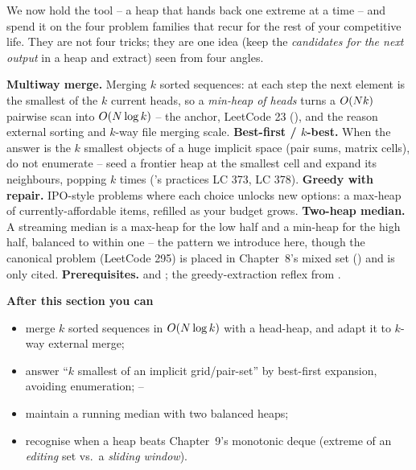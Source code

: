 \begin{topicintro}
We now hold the tool -- a heap that hands back one extreme at a time -- and spend it on the four problem
families that recur for the rest of your competitive life. They are not four tricks; they are one idea
(keep the \emph{candidates for the next output} in a heap and extract) seen from four angles.

\textbf{Multiway merge.} Merging $k$ sorted sequences: at each step the next element is the smallest of the
$k$ current heads, so a \emph{min-heap of heads} turns a $O(Nk)$ pairwise scan into $O(N\log k)$ --
the anchor, LeetCode 23 (), and the reason external sorting and $k$-way file merging
scale. \textbf{Best-first / $k$-best.} When the answer is the $k$ smallest objects of a huge implicit space
(pair sums, matrix cells), do not enumerate -- seed a frontier heap at the smallest cell and expand its
neighbours, popping $k$ times ('s practices LC 373, LC 378). \textbf{Greedy with
repair.} IPO-style problems where each choice unlocks new options: a max-heap of currently-affordable items,
refilled as your budget grows. \textbf{Two-heap median.} A streaming median is a max-heap for the low half
and a min-heap for the high half, balanced to within one -- the pattern we introduce here, though the
canonical problem (LeetCode 295) is placed in Chapter~8's mixed set () and is only cited.
\textbf{Prerequisites.}  and ; the greedy-extraction reflex from
.

\textbf{After this section you can}
\begin{itemize}[nosep]
  \item merge $k$ sorted sequences in $O(N\log k)$ with a head-heap, and adapt it to $k$-way external
        merge; \hfill{}
  \item answer ``$k$ smallest of an implicit grid/pair-set'' by best-first expansion, avoiding enumeration; \hfill{}--
  \item maintain a running median with two balanced heaps; \hfill{}
  \item recognise when a heap beats Chapter~9's monotonic deque (extreme of an \emph{editing} set vs.\ a
        \emph{sliding window}). \hfill{}
\end{itemize}
\end{topicintro}

